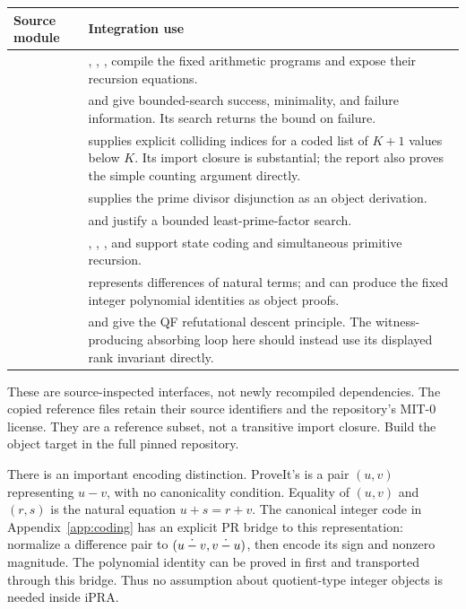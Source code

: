 \begin{longtable}{@{}L{0.34\textwidth}L{0.60\textwidth}@{}}
\toprule
Source module & Integration use\\
\midrule
\endhead
{} & , ,
,  compile the fixed arithmetic programs
and expose their recursion equations.\\
 &  and
 give bounded-search success, minimality,
and failure information. Its search returns the bound on failure.\\
 &  supplies explicit
colliding indices for a coded list of $K+1$ values below $K$. Its import
closure is substantial; the report also proves the simple counting argument
directly.\\
 &  supplies the prime
divisor disjunction as an object derivation.\\
 &  and
 justify a bounded least-prime-factor search.\\
 & , ,
, and  support state coding and simultaneous
primitive recursion.\\
 &  represents differences of natural terms;
 and  can produce the fixed integer
polynomial identities as object proofs.\\
 &  and 
give the QF refutational descent principle. The witness-producing absorbing
loop here should instead use its displayed rank invariant directly.\\
\bottomrule
\end{longtable}

These are source-inspected interfaces, not newly recompiled dependencies.
The copied reference files retain their source identifiers and the
repository's MIT-0 license. They are a reference subset, not a transitive
import closure. Build the object target in the full pinned repository.

There is an important encoding distinction. ProveIt's  is a pair
$(u,v)$ representing $u-v$, with no canonicality condition. Equality of
$(u,v)$ and $(r,s)$ is the natural equation $u+s=r+v$. The canonical
integer code in Appendix~\ref{app:coding} has an explicit PR bridge to
this representation: normalize a difference pair to
$(u\mathbin{\dot{-}} v,v\mathbin{\dot{-}} u)$, then encode its sign and nonzero magnitude.
The polynomial identity can be proved in  first and transported
through this bridge. Thus no assumption about quotient-type integer
objects is needed inside iPRA.

